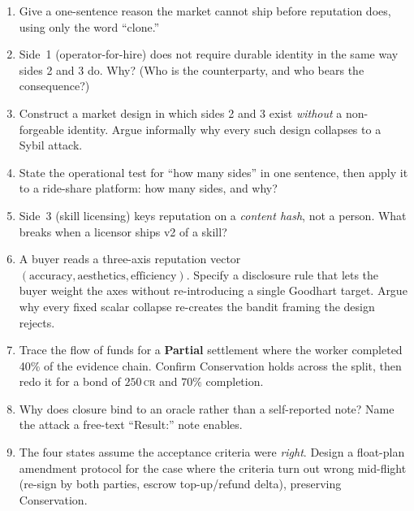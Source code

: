 \begin{enumerate}[label=\textbf{IV.\arabic*},leftmargin=2.8em,itemsep=6pt,topsep=4pt]

\item \wbcheck Give a one-sentence reason the market cannot ship before reputation
  does, using only the word ``clone.''

\item \wbcheck Side~1 (operator-for-hire) does not require durable identity in the
  same way sides 2 and 3 do. Why? (Who is the counterparty, and who bears the
  consequence?)

\item \wbopen\wbstar Construct a market design in which sides 2 and 3 exist
  \emph{without} a non-forgeable identity. Argue informally why every such design
  collapses to a Sybil attack.

\item \wbcheck State the operational test for ``how many sides'' in one sentence,
  then apply it to a ride-share platform: how many sides, and why?

\item \wbtrace Side~3 (skill licensing) keys reputation on a \emph{content hash},
  not a person. What breaks when a licensor ships v2 of a skill?

\item \wbopen\wbstar A buyer reads a three-axis reputation vector
  $(\text{accuracy},\text{aesthetics},\text{efficiency})$. Specify a disclosure rule
  that lets the buyer weight the axes without re-introducing a single Goodhart
  target. Argue why every fixed scalar collapse re-creates the bandit framing the
  design rejects.

\item \wbtrace Trace the flow of funds for a \textbf{Partial} settlement where the
  worker completed 40\% of the evidence chain. Confirm Conservation holds across the
  split, then redo it for a bond of $250$\,\textsc{cr} and $70\%$ completion.

\item \wbcheck Why does closure bind to an oracle rather than a self-reported note?
  Name the attack a free-text ``Result:'' note enables.

\item \wbopen\wbstar The four states assume the acceptance criteria were
  \emph{right}. Design a float-plan amendment protocol for the case where the
  criteria turn out wrong mid-flight (re-sign by both parties, escrow
  top-up/refund delta), preserving Conservation.


\end{enumerate}
